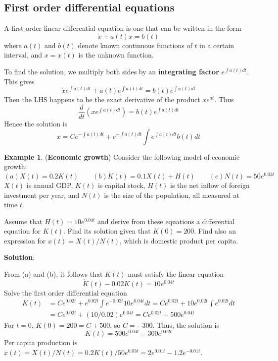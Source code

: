\documentclass[10pt,a4paper]{book}
\theoremstyle{definition}\newtheorem{definition}{Definition}
\theoremstyle{definition}\newtheorem{fact}{Fact}
\theoremstyle{definition}\newtheorem{ex}{Ex.}
\theoremstyle{definition}\newtheorem{project}{Project}
\theoremstyle{definition}\newtheorem{problem}{Problem}
\theoremstyle{definition}\newtheorem{example}{Example}
\numberwithin{theorem}{chapter}
\numberwithin{corollary}{chapter}
\numberwithin{assumption}{chapter}
\numberwithin{definition}{chapter}
\numberwithin{prop}{chapter}
\numberwithin{notation}{chapter}
\numberwithin{problem}{chapter}
\numberwithin{example}{chapter}
\numberwithin{fact}{chapter}
\numberwithin{ex}{chapter}
\begin{document}
	\subsection{First order differential equations}
	
	A first-order linear differential equation is one that can be written in the form
	$$\dot{x} + a(t)x = b(t) $$
	where $a(t)$ and $b(t)$ denote known continuous functions of $t$ in a certain interval, and $x = x(t)$ is the unknown function.
	
	To find the solution, we multiply both sides by an \textbf{integrating factor} $e^{\int a(t)dt}$. This gives
	$$\dot{x}e^{\int a(t)dt} + a(t)e^{\int a(t)dt} = b(t)e^{\int a(t)dt}$$
	Then the LHS happens to be the exact derivative of the product $xe^{at}$. Thus
	$$\frac{d}{dt}(xe^{\int a(t)dt}) = b(t) e^{\int a(t)dt}$$
	Hence the solution is
	$$x=Ce^{-\int a(t)dt} + e^{-\int a(t)dt} \int e^{\int a(t)dt}b(t) dt$$
	
	\begin{example}
		(\textbf{Economic growth}) Consider the following model of economic growth:
		\begin{equation*}
			(a) X(t) = 0.2K(t) \qquad
			(b) \dot{K}(t) = 0.1X(t) + H(t) \qquad
			(c) N(t) = 50 e^{0.03t}
		\end{equation*}
		$X(t)$ is annual GDP, $K(t)$ is capital stock, $H(t)$ is the net inflow of foreign investment per year, and $N(t)$ is the size of the population, all measured at time $t$.
		
		Assume that $H(t) = 10e^{0.04t}$ and derive from these equations a differential equation for $K(t)$. Find its solution given that $K(0) = 200$. Find also an expression for $x(t) = X(t)/N(t)$, which is domestic product per capita.
		
		\textbf{Solution}:
		
		From (a) and (b), it follows that $K(t)$ must satisfy the linear equation
		$$\dot{K}(t) - 0.02K(t) = 10 e^{0.04t}$$
		Solve the first order differential equation
		\begin{align*}
			K(t) & = Ce^{0.02t} + e^{0.02t} \int e^{-0.02t} 10 e^{0.04t} dt = Ce^{0.02t} + 10e^{0.02t} \int e^{0.02t} dt \\
			& = Ce^{0.02t} + (10/0.02)e^{0.04t} = Ce^{0.02t} + 500 e^{0.04t}                                        
		\end{align*}
		For $t = 0$, $K(0) = 200 = C + 500$, so $C = -300$. Thus, the solution is
		$$K(t) = 500 e^{0.04t} - 300e^{0.02t}$$
		Per capita production is $x(t) = X(t)/N(t) = 0.2K(t)/50e^{0.03t} = 2e^{0.01t} - 1.2e^{-0.01t}$.
	\end{example}
	
\end{document}
